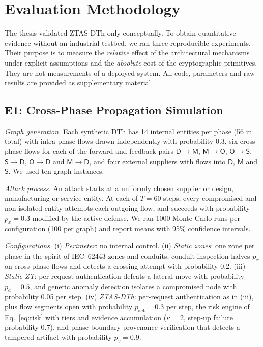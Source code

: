 \documentclass[journal]{IEEEtran}
\newcommand{\ztas}{ZTAS-DTh}
\begin{document}
\section{Evaluation Methodology}
\label{sec:setup}
The thesis validated \ztas{} only conceptually. To obtain quantitative evidence without an industrial testbed, we ran three reproducible experiments. Their purpose is to measure the \emph{relative} effect of the architectural mechanisms under explicit assumptions and the \emph{absolute} cost of the cryptographic primitives. They are not measurements of a deployed system. All code, parameters and raw results are provided as supplementary material.

\subsection{E1: Cross-Phase Propagation Simulation}
\emph{Graph generation.} Each synthetic DTh has 14 internal entities per phase (56 in total) with intra-phase flows drawn independently with probability 0.3, six cross-phase flows for each of the forward and feedback pairs $\mathsf{D}\!\to\!\mathsf{M}$, $\mathsf{M}\!\to\!\mathsf{O}$, $\mathsf{O}\!\to\!\mathsf{S}$, $\mathsf{S}\!\to\!\mathsf{D}$, $\mathsf{O}\!\to\!\mathsf{D}$ and $\mathsf{M}\!\to\!\mathsf{D}$, and four external suppliers with flows into $\mathsf{D}$, $\mathsf{M}$ and $\mathsf{S}$. We used ten graph instances.

\emph{Attack process.} An attack starts at a uniformly chosen supplier or design, manufacturing or service entity. At each of $T=60$ steps, every compromised and non-isolated entity attempts each outgoing flow, and succeeds with probability $p_x=0.3$ modified by the active defense. We ran 1000 Monte-Carlo runs per configuration (100 per graph) and report means with 95\% confidence intervals.

\emph{Configurations.} (i) \emph{Perimeter}: no internal control. (ii) \emph{Static zones}: one zone per phase in the spirit of IEC~62443 zones and conduits; conduit inspection halves $p_x$ on cross-phase flows and detects a crossing attempt with probability 0.2. (iii) \emph{Static ZT}: per-request authentication defeats a lateral move with probability $p_a=0.5$, and generic anomaly detection isolates a compromised node with probability 0.05 per step. (iv) \emph{\ztas{}}: per-request authentication as in (iii), plus flow segments open with probability $p_{\mathrm{act}}=0.3$ per step, the risk engine of Eq.~\eqref{eq:risk} with tiers and evidence accumulation ($\kappa=2$, step-up failure probability 0.7), and phase-boundary provenance verification that detects a tampered artifact with probability $p_v=0.9$.
\end{document}
